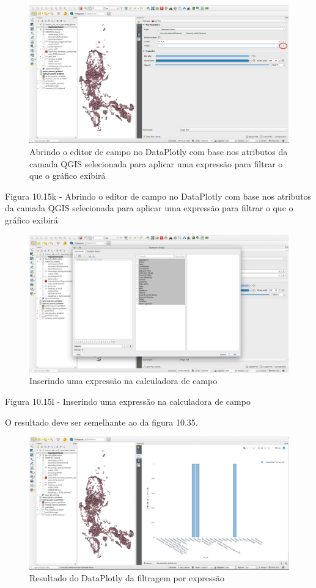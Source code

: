 \documentclass[
]{krantz}
\begin{document}
\begin{figure}
\centering
\includegraphics{media/modulo10/fig1015_k.png}
\caption{Abrindo o editor de campo no DataPlotly com base nos atributos da camada QGIS selecionada para aplicar uma expressão para filtrar o que o gráfico exibirá}
\end{figure}

Figura 10.15k - Abrindo o editor de campo no DataPlotly com base nos atributos da camada QGIS selecionada para aplicar uma expressão para filtrar o que o gráfico exibirá

\begin{figure}
\centering
\includegraphics{media/modulo10/fig1015_l.png}
\caption{Inserindo uma expressão na calculadora de campo}
\end{figure}

Figura 10.15l - Inserindo uma expressão na calculadora de campo

O resultado deve ser semelhante ao da figura 10.35.

\begin{figure}
\centering
\includegraphics{media/modulo10/fig1015_m.png}
\caption{Resultado do DataPlotly da filtragem por expressão}
\end{figure}
\end{document}
